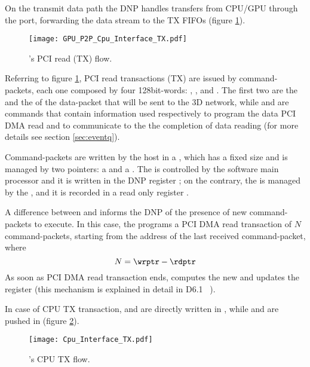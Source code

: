  \label{sub:TxAcceleration}
On the transmit data path the DNP handles transfers from CPU/GPU
through the \PCIe port, forwarding the data stream to the TX FIFOs
(figure \ref{fig:TX_datapath}).

\begin{figure}[!hbt]
  \centering
  \texttt{[image: GPU\_P2P\_Cpu\_Interface\_TX.pdf]}
  \caption{\apenetp's PCI read (TX) flow.}
  \label{fig:TX_datapath}
\end{figure}

Referring to figure \ref{fig:TX_datapath}, PCI read transactions (TX)
are issued by command-packets, each one composed by four 128bit-words:
\header, \footer,  and . The first two are the
\header and the \footer of the data-packet that will be sent to the 3D
network, while  and  are commands that contain
information used respectively to program the data PCI DMA read and to
communicate to the  the completion of data
reading (for more details see section \ref{sec:eventq}).

Command-packets are written by the host in a \ringbuffer, which has a
fixed size and is managed by two pointers: a \writepointer and a
\readpointer.  The \writepointer is controlled by the software main
processor and it is written in the DNP register \wrptr; on the
contrary, the \readpointer is managed by the , and
it is recorded in a read only register \rdptr.

A difference between \wrptr and \rdptr informs the DNP of the presence
of new command-packets to execute. 
In this case, the  programs a PCI DMA read
transaction of $N$ command-packets, starting from the address of the
last received command-packet, where
$$N=\wrptr-\rdptr$$ 
As soon as PCI DMA read transaction ends,  computes
the new \ringbuffer \readpointer and updates the \rdptr register (this
mechanism is explained in detail in D6.1 ~\cite{euretile:D6_1}).

In case of CPU TX transaction, \header and \footer are directly
written in , while  and  are
pushed in  (figure \ref{fig:TX_CPU}).

\begin{figure}[!hbt]
  \centering
  \texttt{[image: Cpu\_Interface\_TX.pdf]}
  \caption{\apenetp's CPU TX flow.}
  \label{fig:TX_CPU}
\end{figure}

